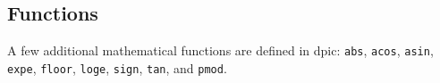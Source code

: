 \documentclass[11pt]{article}
\newcommand{\bq}{}
\newcommand{\Dpic}{{\bq Dpic}\xspace}
\newcommand{\PSTricks}{{\bq PSTricks}\xspace}
\newcommand{\dpic}{{\bq dpic}\xspace}
\newcommand{\ntt}[1]{\\\hbox{}\quad{\tt #1}}
\newcommand{\tBS}{{\tt\char92}}
\begin{document}
\subsection{Functions}
A few additional mathematical functions are defined in dpic:
  {\tt abs}, {\tt acos}, {\tt asin}, {\tt expe}, {\tt floor},
  {\tt loge}, {\tt sign}, {\tt tan}, and {\tt pmod}.

%
\end{document}
